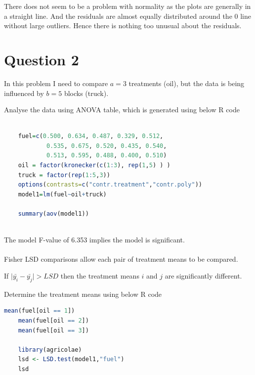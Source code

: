 \documentclass[11pt]{article}
\begin{document}
There does not seem to be a problem with normality as the plots are generally in a straight line.
And the residuals are almost equally distributed around the 0 line without large outliers. Hence there is nothing too unusual about the residuals.

\clearpage

\section{Question 2}

In this problem I need to compare $\displaystyle a=3$ treatments (oil), 
but the data is being influenced by $\displaystyle b=5$ blocks (truck).

Analyse the data using ANOVA table, which is generated using below R code

\begin{lstlisting}[language=R]

    fuel=c(0.500, 0.634, 0.487, 0.329, 0.512,
            0.535, 0.675, 0.520, 0.435, 0.540,
            0.513, 0.595, 0.488, 0.400, 0.510)
    oil = factor(kronecker(c(1:3), rep(1,5) ) )
    truck = factor(rep(1:5,3))
    options(contrasts=c("contr.treatment","contr.poly"))
    model1=lm(fuel~oil+truck)

    summary(aov(model1))
    
\end{lstlisting}



The model F-value of 6.353 implies the model is significant.

\paragraph{}
Fisher LSD comparisons allow each pair of treatment means to be compared. 

If $\displaystyle \mid \bar{y_i} - \bar{y_j} \mid > LSD$ then the treatment means  $\displaystyle i$ and $\displaystyle j$ are significantly different. 

Determine the treatment means using below R code

\begin{lstlisting}[language=R]
    mean(fuel[oil == 1])
    mean(fuel[oil == 2])
    mean(fuel[oil == 3])
    
    library(agricolae)
    lsd <- LSD.test(model1,"fuel")
    lsd    
\end{lstlisting}
\end{document}
